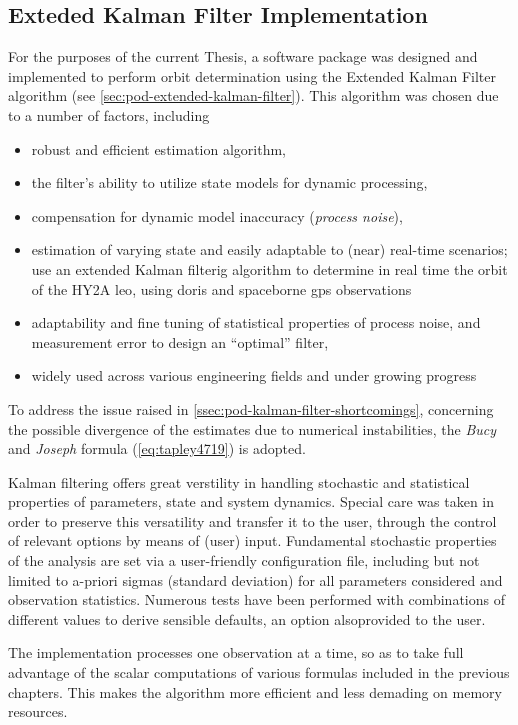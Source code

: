 \subsection{Exteded Kalman Filter Implementation}\label{ssec:ekf-implementation}
For the purposes of the current Thesis, a software package was designed and 
implemented to perform orbit determination using the Extended Kalman Filter 
algorithm (see \autoref{sec:pod-extended-kalman-filter}). This algorithm was 
chosen due to a number of factors, including
\begin{itemize}
  \item robust and efficient estimation algorithm,
  \item the filter's ability to utilize state models for dynamic processing,
  \item compensation for dynamic model inaccuracy (\emph{process noise}),
  \item estimation of varying state and easily adaptable to (near) real-time scenarios; 
    \cite{Zhou2020} use an extended Kalman filterig algorithm to determine in real time 
    the orbit of the HY2A \gls{leo}, using \gls{doris} and spaceborne \gls{gps} 
    observations
  \item adaptability and fine tuning of statistical properties of process noise, 
    and measurement error to design an ``optimal'' filter,
  \item widely used across various engineering fields and under growing progress
\end{itemize}

To address the issue raised in \autoref{ssec:pod-kalman-filter-shortcomings}, 
concerning the possible divergence of the estimates due to numerical instabilities, 
the \emph{Bucy} and \emph{Joseph} formula (\autoref{eq:tapley4719}) is adopted.

Kalman filtering offers great verstility in handling stochastic and statistical 
properties of parameters, state and system dynamics. Special care was taken in 
order to preserve this versatility and transfer it to the user, through the control
of relevant options by means of (user) input. Fundamental stochastic properties of 
the analysis are set via a user-friendly configuration file, including but not 
limited to a-priori sigmas (standard deviation) for all parameters considered and 
observation statistics. Numerous tests have been performed with combinations of 
different values to derive sensible defaults, an option alsoprovided to the user.

The implementation processes one observation at a time, so as to take full advantage 
of the scalar computations of various formulas included in the previous chapters. 
This makes the algorithm more efficient and less demading on memory resources.

